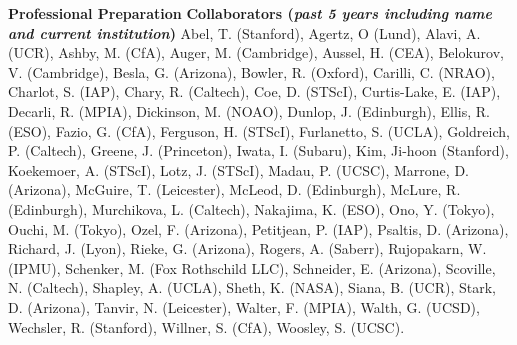 \documentclass[11pt,letterpaper,english]{article}
\begin{document}
\begin{flushleft} {\bf Professional Preparation}
\vspace{-6pt}
{\bf Collaborators ({\emph{past 5 years including name and current institution}})} 
{\parindent 16pt
Abel, T. (Stanford), Agertz, O (Lund), Alavi, A. (UCR), Ashby, M. (CfA), Auger, M. (Cambridge), Aussel, H. (CEA), Belokurov, V. (Cambridge), Besla, G. (Arizona), Bowler, R. (Oxford), Carilli, C. (NRAO), Charlot, S. (IAP), Chary, R. (Caltech), Coe, D. (STScI), Curtis-Lake, E. (IAP), Decarli, R. (MPIA), Dickinson, M. (NOAO), Dunlop, J. (Edinburgh), Ellis, R. (ESO), Fazio, G. (CfA), Ferguson, H. (STScI), Furlanetto, S. (UCLA), Goldreich, P. (Caltech), Greene, J. (Princeton), Iwata, I. (Subaru), Kim, Ji-hoon (Stanford), Koekemoer, A. (STScI), Lotz, J. (STScI), Madau, P. (UCSC), Marrone, D. (Arizona), McGuire, T. (Leicester), McLeod, D. (Edinburgh), McLure, R. (Edinburgh), Murchikova, L. (Caltech), Nakajima, K. (ESO), Ono, Y. (Tokyo), Ouchi, M. (Tokyo), Ozel, F. (Arizona), Petitjean, P. (IAP), Psaltis, D. (Arizona), Richard, J. (Lyon), Rieke, G. (Arizona), Rogers, A. (Saberr), Rujopakarn, W. (IPMU), Schenker, M. (Fox Rothschild LLC), Schneider, E. (Arizona), Scoville, N. (Caltech), Shapley, A. (UCLA), Sheth, K. (NASA), Siana, B. (UCR), Stark, D. (Arizona), Tanvir, N. (Leicester), Walter, F. (MPIA), Walth, G. (UCSD),
Wechsler, R. (Stanford), Willner, S. (CfA), Woosley, S. (UCSC).
}


\end{flushleft}
\end{document}
